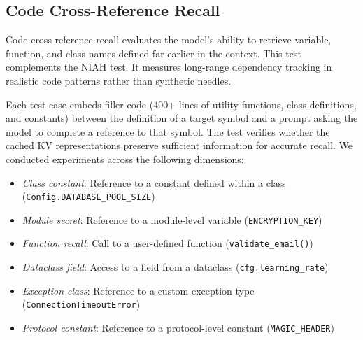 \documentclass[letterpaper]{article} %
\begin{document}
\subsection{Code Cross-Reference Recall}
\label{sec:exp_code_recall}

Code cross-reference recall evaluates the model's ability to retrieve variable, function, and class names 
defined far earlier in the context. This test complements the NIAH test.
It measures long-range dependency tracking in realistic code patterns rather than synthetic needles.

Each test case embeds filler code (400+ lines of utility functions, class definitions, and constants) 
between the definition of a target symbol and a prompt asking the model to complete a reference to that symbol.
The test verifies whether the cached KV representations preserve sufficient information for 
accurate recall. We conducted experiments across the following dimensions:

\begin{itemize}
  \item \emph{Class constant}: Reference to a constant defined within a class (\texttt{Config.DATABASE\_POOL\_SIZE})
  \item \emph{Module secret}: Reference to a module-level variable (\texttt{ENCRYPTION\_KEY})
  \item \emph{Function recall}: Call to a user-defined function (\texttt{validate\_email()})
  \item \emph{Dataclass field}: Access to a field from a dataclass (\texttt{cfg.learning\_rate})
  \item \emph{Exception class}: Reference to a custom exception type (\texttt{ConnectionTimeoutError})
  \item \emph{Protocol constant}: Reference to a protocol-level constant (\texttt{MAGIC\_HEADER})
\end{itemize}
\end{document}
